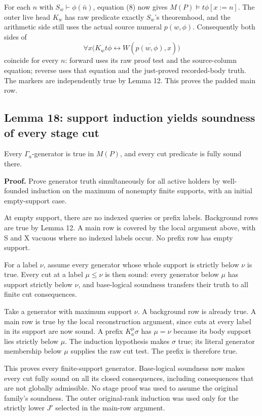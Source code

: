 \documentclass[
  11pt,
  letterpaper,
]{article}
\begin{document}
For each \(n\) with \(S_w\vdash\phi(\bar n)\), equation (8) now gives
\(M(P)\models t\phi[x:=n]\). The outer live head \(K_w\) has raw
predicate exactly \(S_w\)'s theoremhood, and the arithmetic side still
uses the actual source numeral \(p(w,\phi)\). Consequently both sides of
\[
\forall x\bigl(K_wt\phi\leftrightarrow
W(\overline{p(w,\phi)},x)\bigr)
\] coincide for every \(n\): forward uses its raw proof test and the
source-column equation; reverse uses that equation and the just-proved
recorded-body truth. The markers are independently true by Lemma 12.
This proves the padded main row.

\subsection{Lemma 18: support induction yields soundness of every stage
cut}\label{lemma-18-support-induction-yields-soundness-of-every-stage-cut}

Every \(\Gamma_a\)-generator is true in \(M(P)\), and every cut
predicate is fully sound there.

\textbf{Proof.} Prove generator truth simultaneously for all active
holders by well-founded induction on the maximum of nonempty finite
supports, with an initial empty-support case.

At empty support, there are no indexed queries or prefix labels.
Background rows are true by Lemma 12. A main row is covered by the local
argument above, with S and X vacuous where no indexed labels occur. No
prefix row has empty support.

For a label \(\nu\), assume every generator whose whole support is
strictly below \(\nu\) is true. Every cut at a label \(\mu\leq\nu\) is
then sound: every generator below \(\mu\) has support strictly below
\(\nu\), and base-logical soundness transfers their truth to all finite
cut consequences.

Take a generator with maximum support \(\nu\). A background row is
already true. A main row is true by the local reconstruction argument,
since cuts at every label in its support are now sound. A prefix
\(K_a^\mu\sigma\) has \(\mu=\nu\) because its body support lies strictly
below \(\mu\). The induction hypothesis makes \(\sigma\) true; its
literal generator membership below \(\mu\) supplies the raw cut test.
The prefix is therefore true.

This proves every finite-support generator. Base-logical soundness now
makes every cut fully sound on all its closed consequences, including
consequences that are not globally admissible. No stage proof was used
to assume the original family's soundness. The outer original-rank
induction was used only for the strictly lower \(J'\) selected in the
main-row argument.
\end{document}
